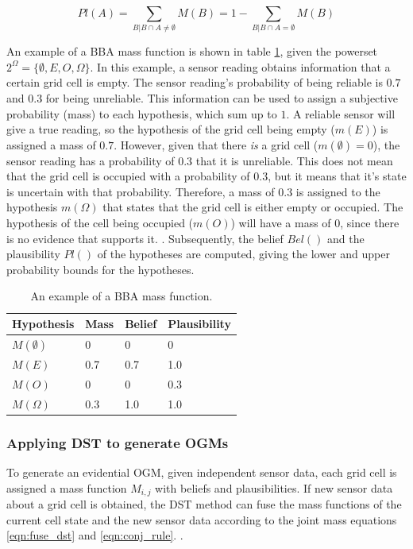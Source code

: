\begin{equation} \label{eqn:plaus_func}
	Pl(A) = \sum_{B|B \cap A \not = \emptyset}^{} M(B) = 1 - \sum_{B|B \cap A = \emptyset}^{} M(B) 
\end{equation}

\hfill \break

An example of a \gls{BBA} mass function is shown in table \ref{tab:belief_func_example}, given the powerset $2^\Omega = \{\emptyset, E, O, \Omega \}$. In this example, a sensor reading obtains information that a certain grid cell is empty. The sensor reading's probability of being reliable is $0.7$ and $0.3$ for being unreliable. This information can be used to assign a subjective probability (mass) to each hypothesis, which sum up to $1$. A reliable sensor will give a true reading, so the hypothesis of the grid cell being empty ($m(E)$) is assigned a mass of $0.7$. However, given that there \textit{is} a grid cell ($m(\emptyset) = 0$), the sensor reading has a probability of $0.3$ that it is unreliable. This does not mean that the grid cell is occupied with a probability of $0.3$, but it means that it's state is uncertain with that probability. Therefore, a mass of $0.3$ is assigned to the hypothesis $m(\Omega)$ that states that the grid cell is either empty or occupied. The hypothesis of the cell being occupied ($m(O)$) will have a mass of $0$, since there is no evidence that supports it. \cite{shafer1992dempster}. Subsequently, the belief $Bel()$ and the plausibility $Pl()$ of the hypotheses are computed, giving the lower and upper probability bounds for the hypotheses. 


\begin{table}[h!]
	\begin{center}
		\caption{An example of a \gls{BBA} mass function.}
		\begin{tabular}{llll} 
			\toprule[0.25ex]
			Hypothesis & Mass & Belief & Plausibility \\ [0.5ex]
			\midrule 
			$M(\emptyset)$ & 0 & 0 & 0 \\ 
			$M(E)$ & 0.7 & 0.7 & 1.0 \\
			$M(O)$ & 0 & 0 & 0.3 \\
			$M(\Omega)$ & 0.3 & 1.0 & 1.0 \\
			\bottomrule[0.25ex]
		\end{tabular}	
		\label{tab:belief_func_example}
	\end{center}
\end{table}

\subsubsection{Applying \gls{DST} to generate \glspl{OGM}}
To generate an evidential \gls{OGM}, given independent sensor data, each grid cell is assigned a mass function $M_{i,j}$ with beliefs and plausibilities. If new sensor data about a grid cell is obtained, the DST method can fuse the mass functions of the current cell state and the new sensor data according to the joint mass equations \ref{eqn:fuse_dst} and \ref{eqn:conj_rule}. \cite{moras2014evidential}.

